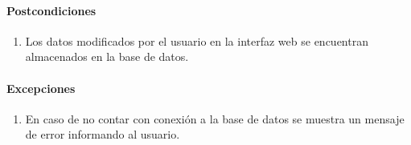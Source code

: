 \paragraph{Postcondiciones}
\begin{enumerate}
  \item Los datos modificados por el usuario en la interfaz web se encuentran almacenados en la base de datos.
\end{enumerate}
\paragraph{Excepciones}
\begin{enumerate}
  \item En caso de no contar con conexión a la base de datos se muestra un mensaje de error informando al usuario.
\end{enumerate}

